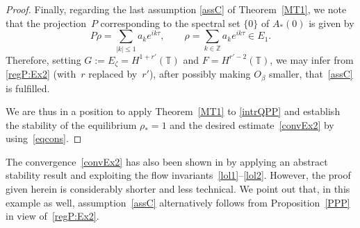 \documentclass[reqno,11pt]{amsart}
\numberwithin{equation}{section}
\theoremstyle{remark}
\begin{document}
\begin{proof}
Finally,  regarding the  last assumption \eqref{assC} of Theorem~\ref{MT1}, we note that the projection~$P$ corresponding to the spectral set $\{0\}$ of $A_*(0)$ is given by
 \[
P \rho =\sum_{|k|\leq 1}  a_k e^{ik\tau},\qquad \rho=\sum_{k\in\mathbb{Z}} a_k e^{ik\tau}\in E_1.
\]
Therefore, setting $G:= E_\zeta=H^{1+r'}(\mathbb{T})$ and $F=H^{r'-2}(\mathbb{T})$, we may infer from 
\eqref{regP:Ex2} (with~$r$ replaced by~$r'$), after possibly making $O_\beta$ smaller,
 that~\eqref{assC} is fulfilled. 
 
We are thus in a position to apply Theorem~\ref{MT1} to \eqref{intrQPP} and establish the stability of the equilibrium $\rho_*=1$ and
the desired estimate~\eqref{convEx2} by using~\eqref{eqcons}.
\end{proof}



The  convergence~\eqref{convEx2}  has also been shown in \cite[Theorem~1.4]{MW2025x} by applying an abstract stability result \cite[Theorem~A.1]{MW2025x} and exploiting the flow invariants~\mbox{\eqref{lol1}–\eqref{lol2}}. However, the proof given herein is considerably shorter and less technical.
We point out that, in this example as well, assumption~\eqref{assC} alternatively follows from Proposition~\ref{PPP} in view of~\eqref{regP:Ex2}.
\end{document}
